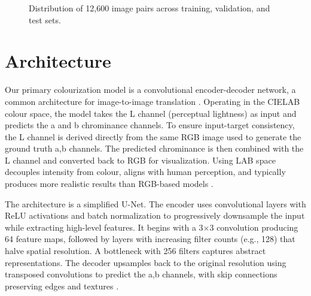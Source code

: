 \documentclass{article} %
\begin{document}
\begin{figure}[h]
\centering
{}
\caption{Distribution of 12{,}600 image pairs across training, validation, and test sets.}
\label{fig:data_split}
\end{figure}

\section{Architecture}

Our primary colourization model is a convolutional encoder-decoder network, a common architecture for image-to-image translation \citep{leatvanich2025image}. Operating in the CIELAB colour 
space, the model takes the L channel (perceptual lightness) as input and predicts the a and b chrominance channels. To ensure input-target consistency, the L channel is derived directly 
from the same RGB image used to generate the ground truth a,b channels. The predicted chrominance is then combined with the L channel and converted back to RGB for visualization. Using 
LAB space decouples intensity from colour, aligns with human perception, and typically produces more realistic results than RGB-based models \citep{leatvanich2025image}.

The architecture is a simplified U-Net. The encoder uses convolutional layers with ReLU activations and batch normalization to progressively downsample the input while extracting high-level 
features. It begins with a 3$\times$3 convolution producing 64 feature maps, followed by layers with increasing filter counts (e.g., 128) that halve spatial resolution. A bottleneck with 256 
filters captures abstract representations. The decoder upsamples back to the original resolution using transposed convolutions to predict the a,b channels, with skip connections preserving 
edges and textures \citep{leatvanich2025image}.
\end{document}
